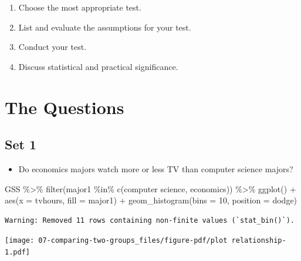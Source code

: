 \documentclass[
  letterpaper,
  DIV=11,
  numbers=noendperiod]{scrreprt}
\newenvironment{Shaded}{\begin{snugshade}}{\end{snugshade}}
\newcommand{\AttributeTok}[1]{\textcolor[rgb]{0.40,0.45,0.13}{#1}}
\newcommand{\DecValTok}[1]{\textcolor[rgb]{0.68,0.00,0.00}{#1}}
\newcommand{\FunctionTok}[1]{\textcolor[rgb]{0.28,0.35,0.67}{#1}}
\newcommand{\NormalTok}[1]{\textcolor[rgb]{0.00,0.23,0.31}{#1}}
\newcommand{\SpecialCharTok}[1]{\textcolor[rgb]{0.37,0.37,0.37}{#1}}
\newcommand{\StringTok}[1]{\textcolor[rgb]{0.13,0.47,0.30}{#1}}
\providecommand{\tightlist}{%
  \setlength{\itemsep}{0pt}\setlength{\parskip}{0pt}}\usepackage{longtable,booktabs,array}
\begin{document}
\begin{enumerate}
\def\labelenumi{\arabic{enumi}.}
\tightlist
\item
  Choose the most appropriate test.
\item
  List and evaluate the assumptions for your test.
\item
  Conduct your test.
\item
  Discuss statistical and practical significance.
\end{enumerate}

\section{The Questions}\label{the-questions}

\subsection{Set 1}\label{set-1}

\begin{itemize}
\tightlist
\item
  Do economics majors watch more or less TV than computer science
  majors?
\end{itemize}

\begin{Shaded}
\begin{Highlighting}[]
\NormalTok{GSS }\SpecialCharTok{\%\textgreater{}\%} 
  \FunctionTok{filter}\NormalTok{(major1 }\SpecialCharTok{\%in\%} \FunctionTok{c}\NormalTok{(}\StringTok{\textquotesingle{}computer science\textquotesingle{}}\NormalTok{, }\StringTok{\textquotesingle{}economics\textquotesingle{}}\NormalTok{)) }\SpecialCharTok{\%\textgreater{}\%} 
  \FunctionTok{ggplot}\NormalTok{() }\SpecialCharTok{+} 
  \FunctionTok{aes}\NormalTok{(}\AttributeTok{x =}\NormalTok{ tvhours, }\AttributeTok{fill =}\NormalTok{ major1) }\SpecialCharTok{+} 
  \FunctionTok{geom\_histogram}\NormalTok{(}\AttributeTok{bins =} \DecValTok{10}\NormalTok{, }\AttributeTok{position =} \StringTok{\textquotesingle{}dodge\textquotesingle{}}\NormalTok{)}
\end{Highlighting}
\end{Shaded}

\begin{verbatim}
Warning: Removed 11 rows containing non-finite values (`stat_bin()`).
\end{verbatim}

\texttt{[image: 07-comparing-two-groups\_files/figure-pdf/plot relationship-1.pdf]}
\end{document}
